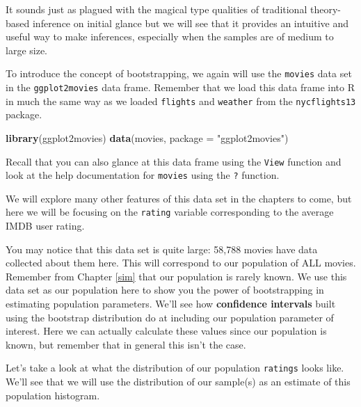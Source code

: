 \documentclass[]{tufte-book}
\newenvironment{Shaded}{\begin{snugshade}}{\end{snugshade}}
\newcommand{\KeywordTok}[1]{\textcolor[rgb]{0.13,0.29,0.53}{\textbf{{#1}}}}
\newcommand{\DataTypeTok}[1]{\textcolor[rgb]{0.13,0.29,0.53}{{#1}}}
\newcommand{\DecValTok}[1]{\textcolor[rgb]{0.00,0.00,0.81}{{#1}}}
\newcommand{\StringTok}[1]{\textcolor[rgb]{0.31,0.60,0.02}{{#1}}}
\newcommand{\NormalTok}[1]{{#1}}
\begin{document}
It sounds just as plagued with the magical type qualities of traditional
theory-based inference on initial glance but we will see that it
provides an intuitive and useful way to make inferences, especially when
the samples are of medium to large size.

To introduce the concept of bootstrapping, we again will use the
\texttt{movies} data set in the \texttt{ggplot2movies} data frame.
Remember that we load this data frame into R in much the same way as we
loaded \texttt{flights} and \texttt{weather} from the
\texttt{nycflights13} package.

\begin{Shaded}
\begin{Highlighting}[]
\KeywordTok{library}\NormalTok{(ggplot2movies)}
\KeywordTok{data}\NormalTok{(movies, }\DataTypeTok{package =} \StringTok{"ggplot2movies"}\NormalTok{)}
\end{Highlighting}
\end{Shaded}

Recall that you can also glance at this data frame using the
\texttt{View} function and look at the help documentation for
\texttt{movies} using the \texttt{?} function.

We will explore many other features of this data set in the chapters to
come, but here we will be focusing on the \texttt{rating} variable
corresponding to the average IMDB user rating.

You may notice that this data set is quite large: 58,788 movies have
data collected about them here. This will correspond to our population
of ALL movies. Remember from Chapter \ref{sim} that our population is
rarely known. We use this data set as our population here to show you
the power of bootstrapping in estimating population parameters. We'll
see how \textbf{confidence intervals} built using the bootstrap
distribution do at including our population parameter of interest. Here
we can actually calculate these values since our population is known,
but remember that in general this isn't the case.

Let's take a look at what the distribution of our population
\texttt{ratings} looks like. We'll see that we will use the distribution
of our sample(s) as an estimate of this population histogram.

\begin{Shaded}
\end{Shaded}
\end{document}
